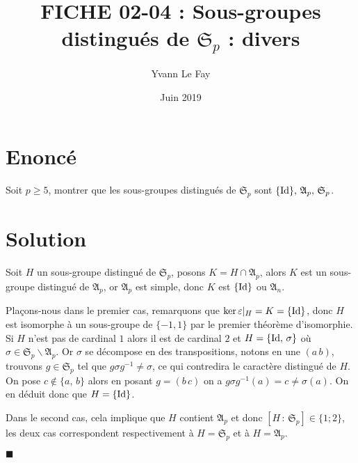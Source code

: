 \documentclass{article}
\newcommand*{\QED}{\hfill\ensuremath{\blacksquare}}%
\begin{document}
\title{FICHE 02-04 : Sous-groupes distingués de $\mathfrak{S}_p$ : divers}
\author{Yvann Le Fay}
\date{Juin 2019}
\maketitle
\section*{Enoncé}
Soit $p\geq 5$, montrer que les sous-groupes distingués de $\mathfrak{S}_p$ sont $\{\textup{Id}\},\, \mathfrak{A}_p,\, \mathfrak{S}_p$.

\section*{Solution}
Soit $H$ un sous-groupe distingué de $\mathfrak{S}_p$, posons $K=H\cap \mathfrak{A}_p$, alors $K$ est un sous-groupe distingué de $\mathfrak{A}_p$, or $\mathfrak{A}_p$ est simple, donc $K$ est $\{\textup{Id}\}$ ou $\mathfrak{A}_n$. 

Plaçons-nous dans le premier cas, remarquons que $\ker \varepsilon|_{H} = K = \{\textup{Id}\}$, donc $H$ est isomorphe à un sous-groupe de $\{-1,1\}$ par le premier théorème d'isomorphie. Si $H$ n'est pas de cardinal $1$ alors il est de cardinal $2$ et $H = \{\textup{Id},\, \sigma\}$ où $\sigma\in \mathfrak{S}_p\backslash\mathfrak{A}_p$. Or $\sigma$ se décompose en des transpositions, notons en une $(a\, b)$, trouvons $g\in\mathfrak{S}_p$ tel que $g\sigma g^{-1}\neq \sigma$, ce qui contredira le caractère distingué de $H$. On pose $c\notin\{a,\,b\}$ alors en posant $g=(b\, c)$ on a $g\sigma g^{-1}(a) = c \neq \sigma(a)$. On en déduit donc que $H=\{\textup{Id}\}$.

Dans le second cas, cela implique que $H$ contient $\mathfrak{A}_p$ et donc $[H\,:\,\mathfrak{S}_p]\in\{1;2\}$, les deux cas correspondent respectivement à $H = \mathfrak{S}_p$ et à $H = \mathfrak{A}_p$.

\QED
\end{document}
